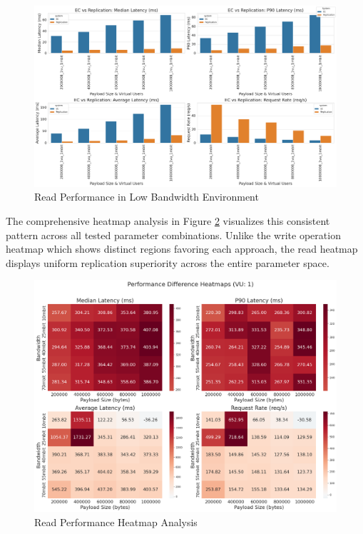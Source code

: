 \begin{figure}[ht]
\centering
\includegraphics[width=\columnwidth]{resources/chapter-4/read_bigload_slownet.png}
\caption{Read Performance in Low Bandwidth Environment}
\label{fig:read-slownet}
\end{figure}

The comprehensive heatmap analysis in Figure \ref{fig:read-heatmap} visualizes this consistent pattern across all tested parameter combinations. Unlike the write operation heatmap which shows distinct regions favoring each approach, the read heatmap displays uniform replication superiority across the entire parameter space.

\begin{figure}[ht]
\centering
\includegraphics[width=\columnwidth]{resources/chapter-4/read_bigload_avgnet_heatmap.png}
\caption{Read Performance Heatmap Analysis}
\label{fig:read-heatmap}
\end{figure}

